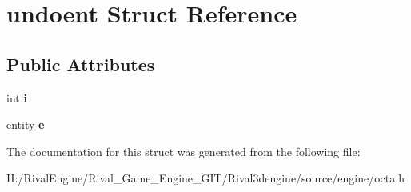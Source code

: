 \hypertarget{structundoent}{}\section{undoent Struct Reference}
\label{structundoent}
\subsection*{Public Attributes}
\begin{DoxyCompactItemize}
\item 
\mbox{\label{structundoent_a76dc6ff24a0f4599c90efe6f5cd6485e}} 
int {\bfseries i}
\item 
\mbox{\label{structundoent_a1229087dd2f430949cb449093084333b}} 
\hyperlink{structentity}{entity} {\bfseries e}
\end{DoxyCompactItemize}


The documentation for this struct was generated from the following file\+:\begin{DoxyCompactItemize}
\item 
H\+:/\+Rival\+Engine/\+Rival\+\_\+\+Game\+\_\+\+Engine\+\_\+\+G\+I\+T/\+Rival3dengine/source/engine/octa.\+h\end{DoxyCompactItemize}
